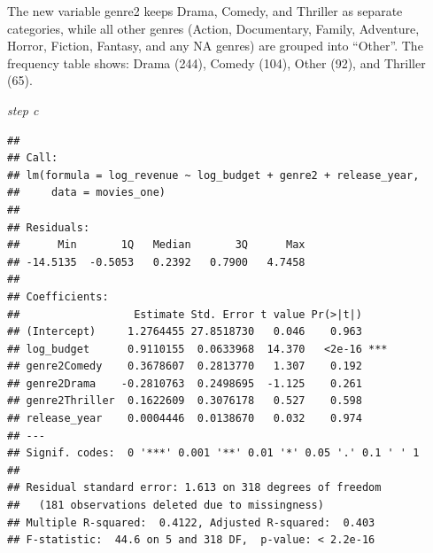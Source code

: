 \documentclass[
]{article}
\newenvironment{Shaded}{\begin{snugshade}}{\end{snugshade}}
\newcommand{\AttributeTok}[1]{\textcolor[rgb]{0.13,0.29,0.53}{#1}}
\newcommand{\CommentTok}[1]{\textcolor[rgb]{0.56,0.35,0.01}{\textit{#1}}}
\newcommand{\FunctionTok}[1]{\textcolor[rgb]{0.13,0.29,0.53}{\textbf{#1}}}
\newcommand{\NormalTok}[1]{#1}
\newcommand{\OtherTok}[1]{\textcolor[rgb]{0.56,0.35,0.01}{#1}}
\newcommand{\SpecialCharTok}[1]{\textcolor[rgb]{0.81,0.36,0.00}{\textbf{#1}}}
\newcommand{\StringTok}[1]{\textcolor[rgb]{0.31,0.60,0.02}{#1}}
\begin{document}
The new variable genre2 keeps Drama, Comedy, and Thriller as separate
categories, while all other genres (Action, Documentary, Family,
Adventure, Horror, Fiction, Fantasy, and any NA genres) are grouped into
``Other''. The frequency table shows: Drama (244), Comedy (104), Other
(92), and Thriller (65).

\emph{step c}

\begin{Shaded}
\end{Shaded}

\begin{verbatim}
## 
## Call:
## lm(formula = log_revenue ~ log_budget + genre2 + release_year, 
##     data = movies_one)
## 
## Residuals:
##      Min       1Q   Median       3Q      Max 
## -14.5135  -0.5053   0.2392   0.7900   4.7458 
## 
## Coefficients:
##                  Estimate Std. Error t value Pr(>|t|)    
## (Intercept)     1.2764455 27.8518730   0.046    0.963    
## log_budget      0.9110155  0.0633968  14.370   <2e-16 ***
## genre2Comedy    0.3678607  0.2813770   1.307    0.192    
## genre2Drama    -0.2810763  0.2498695  -1.125    0.261    
## genre2Thriller  0.1622609  0.3076178   0.527    0.598    
## release_year    0.0004446  0.0138670   0.032    0.974    
## ---
## Signif. codes:  0 '***' 0.001 '**' 0.01 '*' 0.05 '.' 0.1 ' ' 1
## 
## Residual standard error: 1.613 on 318 degrees of freedom
##   (181 observations deleted due to missingness)
## Multiple R-squared:  0.4122, Adjusted R-squared:  0.403 
## F-statistic:  44.6 on 5 and 318 DF,  p-value: < 2.2e-16
\end{verbatim}
\end{document}
